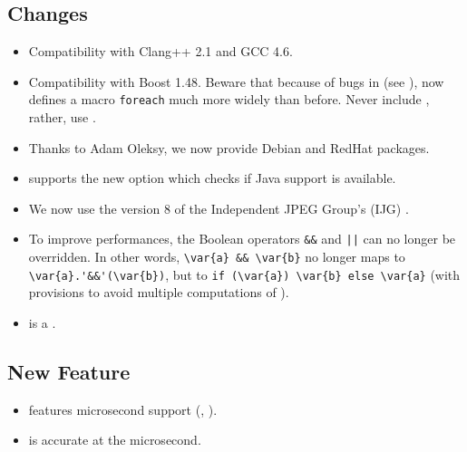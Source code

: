 \subsection{Changes}
\begin{itemize}
\item Compatibility with Clang++ 2.1 and GCC 4.6.
\item Compatibility with Boost 1.48.  Beware that because of bugs in
  (see ),
  \usdk now defines a macro \lstinline{foreach} much more widely than
  before.  Never include , rather, use
  .
\item Thanks to Adam Oleksy, we now provide Debian and RedHat packages.
\item {} supports the new option 
  which checks if Java support is available.
\item We now use the version 8 of the Independent JPEG Group's (IJG)
  .
\item To improve performances, the Boolean operators \lstinline{&&} and
  \lstinline{||} can no longer be overridden.  In other words,
  \lstinline|\var{a} && \var{b}| no longer maps to
  \lstinline|\var{a}.'&&'(\var{b})|, but to
  \lstinline|if (\var{a}) \var{b} else \var{a}| (with provisions to avoid
  multiple computations of ).
\item {} is a .
\end{itemize}

\subsection{New Feature}
\begin{itemize}
\item {} features microsecond support
  (, ).
\item {} is accurate at the microsecond.
\end{itemize}

